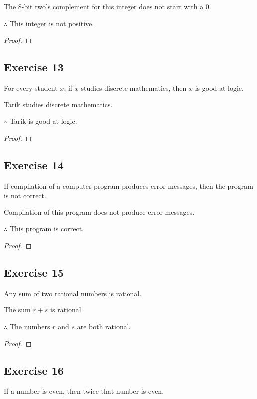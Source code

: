 \documentclass[14pt]{extarticle}
\begin{document}
The 8-bit two’s complement for this integer does not start with a 0.

$\therefore$ This integer is not positive.

\begin{proof}

\end{proof}

\subsection{Exercise 13}
For every student $x$, if $x$ studies discrete mathematics, then $x$ is good at logic.

Tarik studies discrete mathematics.

$\therefore$ Tarik is good at logic.

\begin{proof}

\end{proof}

\subsection{Exercise 14}
If compilation of a computer program produces error messages, then the program is not correct.

Compilation of this program does not produce error messages.

$\therefore$ This program is correct.

\begin{proof}

\end{proof}

\subsection{Exercise 15}
Any sum of two rational numbers is rational.

The sum $r + s$ is rational.

$\therefore$ The numbers $r$ and $s$ are both rational.

\begin{proof}

\end{proof}

\subsection{Exercise 16}
If a number is even, then twice that number is even.
\end{document}

